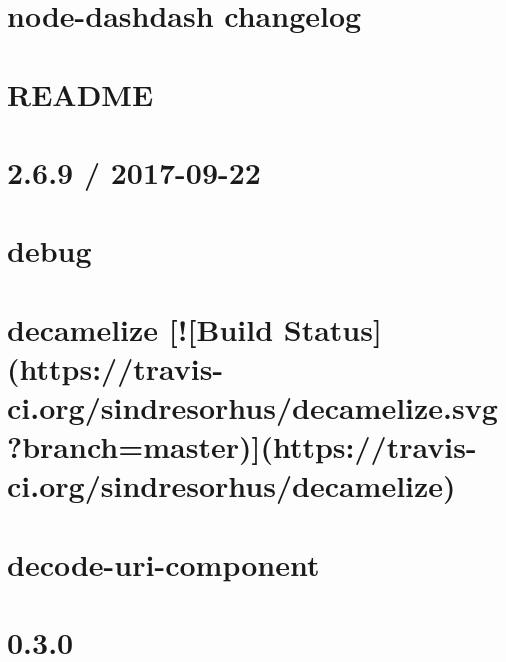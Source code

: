 \documentclass[twoside]{book}
\newcommand{\+}{\discretionary{\mbox{\scriptsize$\hookleftarrow$}}{}{}}
\begin{document}
\chapter{node-\/dashdash changelog}
\label{md_dsmacc_vis_degree_node_modules_dashdash_CHANGES}

\chapter{R\+E\+A\+D\+ME}
\label{md_dsmacc_vis_degree_node_modules_dashdash_README}

\chapter{2.6.9 / 2017-\/09-\/22}
\label{md_dsmacc_vis_degree_node_modules_debug_CHANGELOG}

\chapter{debug}
\label{md_dsmacc_vis_degree_node_modules_debug_README}

\chapter{decamelize \mbox{[}!\mbox{[}Build Status\mbox{]}(https\+://travis-\/ci.org/sindresorhus/decamelize.svg?branch=master)\mbox{]}(https\+://travis-\/ci.org/sindresorhus/decamelize)}
\label{md_dsmacc_vis_degree_node_modules_decamelize_readme}

\chapter{decode-\/uri-\/component}
\label{md_dsmacc_vis_degree_node_modules_decode-uri-component_readme}

\chapter{0.3.0}
\label{md_dsmacc_vis_degree_node_modules_decompress-zip_changelog}

\end{document}
